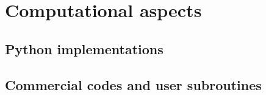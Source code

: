 %

\chapter{Computational aspects}
\section{Python implementations}
\section{Commercial codes and user subroutines}





